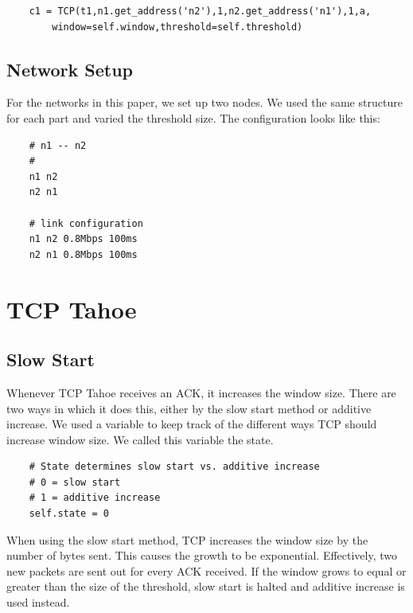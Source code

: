 \documentclass[11pt]{article}
\begin{document}
\begin{lstlisting}
    c1 = TCP(t1,n1.get_address('n2'),1,n2.get_address('n1'),1,a,
        window=self.window,threshold=self.threshold)
\end{lstlisting}

\vspace{5mm}

\subsection{Network Setup}

For the networks in this paper, we set up two nodes. We used the same structure for each part and varied the threshold size. The configuration looks like this:

\vspace{5mm}

\begin{lstlisting}
    # n1 -- n2
    #
    n1 n2
    n2 n1

    # link configuration
    n1 n2 0.8Mbps 100ms
    n2 n1 0.8Mbps 100ms
\end{lstlisting}

\vspace{5mm}

\section{TCP Tahoe}

\subsection{Slow Start}

Whenever TCP Tahoe receives an ACK, it increases the window size. There are two ways in which it does this, either by the slow start method or additive increase. We used a variable to keep track of the different ways TCP should increase window size. We called this variable the state.

\vspace{5mm}

\begin{lstlisting}
    # State determines slow start vs. additive increase
    # 0 = slow start
    # 1 = additive increase
    self.state = 0
\end{lstlisting}

\vspace{5mm}

When using the slow start method, TCP increases the window size by the number of bytes sent. This causes the growth to be exponential. Effectively, two new packets are sent out for every ACK received. If the window grows to equal or greater than the size of the threshold, slow start is halted and additive increase is used instead.
\end{document}

